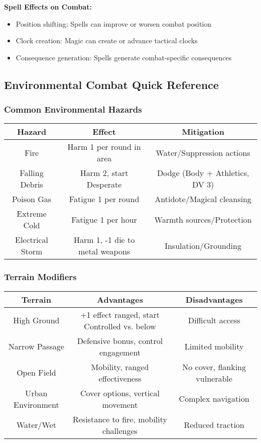 \textbf{Spell Effects on Combat:}
\begin{itemize}[leftmargin=*]
    \item Position shifting: Spells can improve or worsen combat position
    \item Clock creation: Magic can create or advance tactical clocks
    \item Consequence generation: Spells generate combat-specific consequences
\end{itemize}

\subsection{Environmental Combat Quick Reference}

\subsubsection{Common Environmental Hazards}

\begin{center}
\begin{tabular}{|c|c|c|}
\hline
\textbf{Hazard} & \textbf{Effect} & \textbf{Mitigation} \\
\hline
Fire & Harm 1 per round in area & Water/Suppression actions \\
\hline
Falling Debris & Harm 2, start Desperate & Dodge (Body + Athletics, DV 3) \\
\hline
Poison Gas & Fatigue 1 per round & Antidote/Magical cleansing \\
\hline
Extreme Cold & Fatigue 1 per hour & Warmth sources/Protection \\
\hline
Electrical Storm & Harm 1, -1 die to metal weapons & Insulation/Grounding \\
\hline
\end{tabular}
\end{center}

\subsubsection{Terrain Modifiers}

\begin{center}
\begin{tabular}{|c|c|c|}
\hline
\textbf{Terrain} & \textbf{Advantages} & \textbf{Disadvantages} \\
\hline
High Ground & +1 effect ranged, start Controlled vs. below & Difficult access \\
\hline
Narrow Passage & Defensive bonus, control engagement & Limited mobility \\
\hline
Open Field & Mobility, ranged effectiveness & No cover, flanking vulnerable \\
\hline
Urban Environment & Cover options, vertical movement & Complex navigation \\
\hline
Water/Wet & Resistance to fire, mobility challenges & Reduced traction \\
\hline
\end{tabular}
\end{center}

